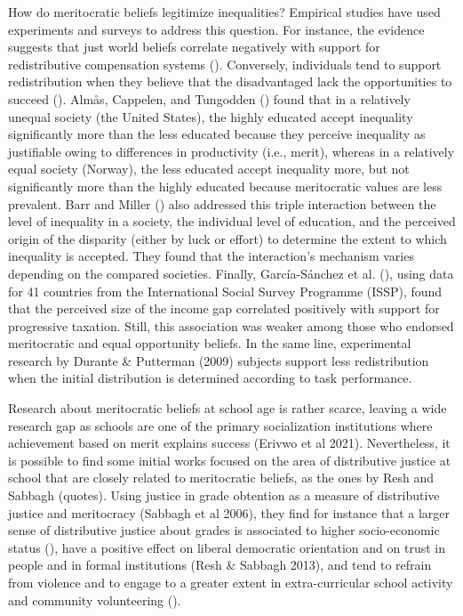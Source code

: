 \documentclass[
  letterpaper,
  DIV=11,
  numbers=noendperiod]{scrartcl}
\begin{document}
How do meritocratic beliefs legitimize inequalities? Empirical studies
have used experiments and surveys to address this question. For
instance, the evidence suggests that just world beliefs correlate
negatively with support for redistributive compensation systems
(). Conversely, individuals tend to support redistribution when they
believe that the disadvantaged lack the opportunities to succeed
(). Almås,
Cappelen, and Tungodden ()
found that in a relatively unequal society (the United States), the
highly educated accept inequality significantly more than the less
educated because they perceive inequality as justifiable owing to
differences in productivity (i.e., merit), whereas in a relatively equal
society (Norway), the less educated accept inequality more, but not
significantly more than the highly educated because meritocratic values
are less prevalent. Barr and Miller
() also addressed this triple
interaction between the level of inequality in a society, the individual
level of education, and the perceived origin of the disparity (either by
luck or effort) to determine the extent to which inequality is accepted.
They found that the interaction's mechanism varies depending on the
compared societies. Finally, García-Sánchez et al.
(), using data for 41
countries from the International Social Survey Programme (ISSP), found
that the perceived size of the income gap correlated positively with
support for progressive taxation. Still, this association was weaker
among those who endorsed meritocratic and equal opportunity beliefs. In
the same line, experimental research by Durante \& Putterman (2009)
subjects support less redistribution when the initial distribution is
determined according to task performance.

Research about meritocratic beliefs at school age is rather scarce,
leaving a wide research gap as schools are one of the primary
socialization institutions where achievement based on merit explains
success (Erivwo et al 2021). Nevertheless, it is possible to find some
initial works focused on the area of distributive justice at school that
are closely related to meritocratic beliefs, as the ones by Resh and
Sabbagh (quotes). Using justice in grade obtention as a measure of
distributive justice and meritocracy (Sabbagh et al 2006), they find for
instance that a larger sense of distributive justice about grades is
associated to higher socio-economic status
(), have a positive effect on
liberal democratic orientation and on trust in people and in formal
institutions (Resh \& Sabbagh 2013), and tend to refrain from violence
and to engage to a greater extent in extra-curricular school activity
and community volunteering ().
\end{document}
